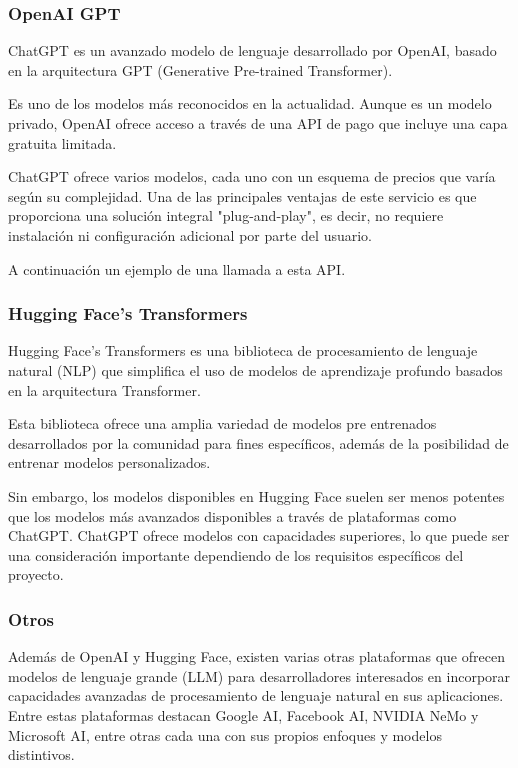 \subsubsection*{OpenAI GPT}
ChatGPT es un avanzado modelo de lenguaje desarrollado por OpenAI,
basado en la arquitectura GPT (Generative Pre-trained Transformer).

Es uno de los modelos más reconocidos en la actualidad. Aunque es un modelo privado, OpenAI ofrece
acceso a través de una API de pago que incluye una capa gratuita limitada.

ChatGPT ofrece varios modelos, cada uno con un esquema de precios que varía según
su complejidad. Una de las principales ventajas de este servicio
es que proporciona una solución integral "plug-and-play",
es decir, no requiere instalación ni configuración adicional por parte del usuario.

A continuación un ejemplo de una llamada a esta API.


\subsubsection*{Hugging Face's Transformers}
Hugging Face's Transformers
es una biblioteca de procesamiento de lenguaje natural (NLP) que simplifica el uso de modelos de aprendizaje profundo
basados en la arquitectura Transformer.

Esta biblioteca ofrece una amplia variedad de modelos pre entrenados desarrollados por la comunidad
para fines específicos, además de la posibilidad de entrenar modelos personalizados.


Sin embargo, los modelos disponibles en Hugging Face suelen ser menos potentes que los modelos más
avanzados disponibles a través de plataformas como ChatGPT. ChatGPT ofrece
modelos con capacidades superiores, lo que puede ser una
consideración importante dependiendo de los requisitos específicos del proyecto.

\subsubsection*{Otros}
Además de OpenAI y Hugging Face, existen varias otras plataformas que ofrecen modelos de lenguaje
grande (LLM) para desarrolladores interesados en incorporar capacidades
avanzadas de procesamiento de lenguaje natural en sus aplicaciones. Entre
estas plataformas destacan Google AI, Facebook AI, NVIDIA NeMo y Microsoft AI, entre otras cada una con sus propios
enfoques y modelos distintivos.
